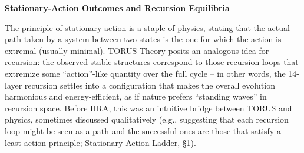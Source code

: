 \documentclass[]{article}
\begin{document}
\textbf{Stationary-Action Outcomes and Recursion Equilibria}

The principle of stationary action is a staple of physics, stating that
the actual path taken by a system between two states is the one for
which the action is extremal (usually minimal). TORUS Theory posits an
analogous idea for recursion: the observed stable structures correspond
to those recursion loops that extremize some ``action''-like quantity
over the full cycle -- in other words, the 14-layer recursion settles
into a configuration that makes the overall evolution harmonious and
energy-efficient, as if nature prefers ``standing waves'' in recursion
space. Before HRA, this was an intuitive bridge between TORUS and
physics, sometimes discussed qualitatively (e.g., suggesting that each
recursion loop might be seen as a path and the successful ones are those
that satisfy a least-action principle; Stationary-Action Ladder, §1).
\end{document}
